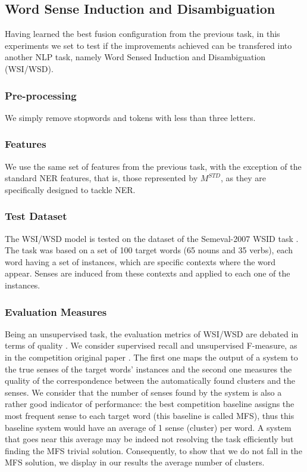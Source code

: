\documentclass{llncs}
\begin{document}
\subsection{Word Sense Induction and Disambiguation}
Having learned the best fusion configuration from the previous task, in this experiments we set to test if the improvements achieved can be transfered into another NLP task, namely Word Sensed Induction and Disambiguation (WSI/WSD).

\subsubsection{Pre-processing}
We simply remove stopwords and tokens with less than three letters.
\subsubsection{Features}
We use the same set of features from the previous task, with the exception of the standard NER features, that is, those represented by $M^{STD}$, as they are specifically designed to tackle NER.
\subsubsection{Test Dataset}
The WSI/WSD model is tested on the dataset of  the Semeval-2007 WSID task \cite{Agirre2007}. The task was based on a set of 100 target words (65 nouns and 35 verbs), each  word having a set of instances, which are specific contexts where the word appear. Senses are induced from these contexts and applied to each one of the instances.


\subsubsection{Evaluation Measures}
Being an unsupervised task, the evaluation metrics of WSI/WSD are debated in terms of quality \cite{CruysA11}. We consider supervised recall and unsupervised F-measure, as in the competition original paper \cite{Agirre2007}. The first one maps the output of a system to the true senses of the target words' instances and the second one measures the quality of the correspondence between the automatically found clusters and the senses. 
We consider that the number of senses found by the system is also a rather good indicator of performance: the best competition baseline assigns the most frequent sense to each target word (this baseline is called MFS), thus this baseline system would have an average of 1 sense (cluster) per word. A system that goes near this average may be indeed not resolving the task efficiently but finding the MFS trivial solution. Consequently, to show that we do not fall in the MFS solution, we display in our results the average number of clusters.
\end{document}
